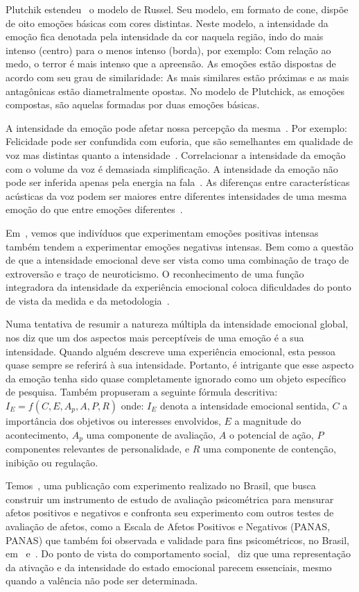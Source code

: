 Plutchik estendeu~\cite{57} o modelo de Russel. Seu modelo, em formato de cone, dispõe de oito emoções básicas com cores distintas. Neste modelo, a intensidade da emoção fica denotada pela intensidade da cor naquela região, indo do mais intenso (centro) para o menos intenso (borda), por exemplo: Com relação ao medo, o terror é mais intenso que a apreensão. As emoções estão dispostas de acordo com seu grau de similaridade: As mais similares estão próximas e as mais antagônicas estão diametralmente opostas. No modelo de Plutchick, as emoções compostas, são aquelas formadas por duas emoções básicas.

A intensidade da emoção pode afetar nossa percepção da mesma~\cite{18.46}. Por exemplo: Felicidade pode ser confundida com euforia, que são semelhantes em qualidade de voz mas distintas quanto a intensidade~\cite{18.9}. Correlacionar a intensidade da emoção com o volume da voz é demasiada simplificação. A intensidade da emoção não pode ser inferida apenas pela energia na fala~\cite{18.12}. As diferenças entre características acústicas da voz podem ser maiores entre diferentes intensidades de uma mesma emoção do que entre emoções diferentes~\cite{18.46}. 

Em~\cite{emoint1}, vemos que indivíduos que experimentam emoções positivas intensas também tendem a experimentar emoções negativas intensas. Bem como a questão de que a intensidade emocional deve ser vista como uma combinação de traço de extroversão e traço de neuroticismo. O reconhecimento de uma função integradora da intensidade da experiência emocional coloca dificuldades do ponto de vista da medida e da metodologia~\cite{emoint2}.

Numa tentativa de resumir a natureza múltipla da intensidade emocional global,~\cite{emoint2.1} nos diz que um dos aspectos mais perceptíveis de uma emoção é a sua intensidade. Quando alguém descreve uma experiência emocional, esta pessoa quase sempre se referirá à sua intensidade. Portanto, é intrigante que esse aspecto da emoção tenha sido quase completamente ignorado como um objeto específico de pesquisa. Também propuseram a seguinte fórmula descritiva: $I_E = f(C, E, A_p, A, P, R)$ onde: $I_E$ denota a intensidade emocional sentida, $C$ a importância dos objetivos ou interesses envolvidos, $E$ a magnitude do acontecimento, $A_p$ uma componente de avaliação, $A$ o potencial de ação, $P$ componentes relevantes de personalidade, e $R$ uma componente de contenção, inibição ou regulação.

Temos~\cite{emoint3}, uma publicação com experimento realizado no Brasil, que busca construir um instrumento de estudo de avaliação psicométrica para mensurar afetos positivos e negativos e confronta seu experimento com outros testes de avaliação de afetos, como a Escala de Afetos Positivos e Negativos (\acrlong{PANAS}, \acrshort{PANAS}) que também foi observada e validade para fins psicométricos, no Brasil, em~\cite{panas1} e~\cite{panas2}. Do ponto de vista do comportamento social,~\cite{16} diz que uma representação da ativação e da intensidade do estado emocional parecem essenciais, mesmo quando a valência não pode ser determinada.



